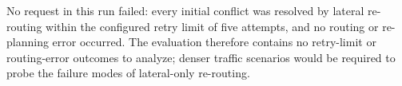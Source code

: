 No request in this run failed: every initial conflict was resolved by lateral re-routing within the configured retry limit of five attempts, and no routing or re-planning error occurred. The evaluation therefore contains no retry-limit or routing-error outcomes to analyze; denser traffic scenarios would be required to probe the failure modes of lateral-only re-routing.

\FloatBarrier
